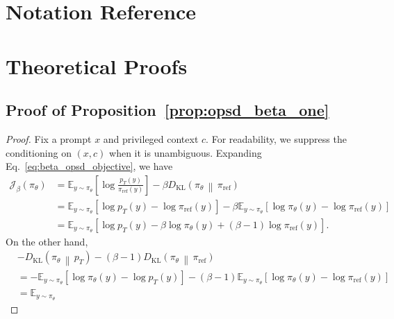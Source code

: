 \newpage

\section{Notation Reference}
\label{app:notation}

\clearpage

\section{Theoretical Proofs}
\label{app:rtg-proofs}
\subsection{Proof of Proposition~\ref{prop:opsd_beta_one}}
\label{app:regularized_rl}
\begin{proof}
Fix a prompt $x$ and privileged context $c$. For readability, we suppress the conditioning
on $(x,c)$ when it is unambiguous. Expanding Eq.~\ref{eq:beta_opsd_objective}, we have
\begin{align}
    \mathcal{J}_{\beta}(\pi_\theta)
    &=
    \mathbb{E}_{y\sim\pi_\theta}
    \left[
    \log
    \frac{
    p_T(y)
    }{
    \pi_{\mathrm{ref}}(y)
    }
    \right]
    -
    \beta
    D_{\mathrm{KL}}
    \left(
    \pi_\theta
    \,\middle\|\,
    \pi_{\mathrm{ref}}
    \right) \\
    &=
    \mathbb{E}_{y\sim\pi_\theta}
    \left[
    \log p_T(y)
    -
    \log \pi_{\mathrm{ref}}(y)
    \right]
    -
    \beta
    \mathbb{E}_{y\sim\pi_\theta}
    \left[
    \log \pi_\theta(y)
    -
    \log \pi_{\mathrm{ref}}(y)
    \right] \\
    &=
    \mathbb{E}_{y\sim\pi_\theta}
    \left[
    \log p_T(y)
    -
    \beta \log \pi_\theta(y)
    +
    (\beta-1)\log \pi_{\mathrm{ref}}(y)
    \right].
    \label{eq:beta_opsd_expanded}
\end{align}
On the other hand,
\begin{align}
    &-
    D_{\mathrm{KL}}
    \left(
    \pi_\theta
    \,\middle\|\,
    p_T
    \right)
    -
    (\beta-1)
    D_{\mathrm{KL}}
    \left(
    \pi_\theta
    \,\middle\|\,
    \pi_{\mathrm{ref}}
    \right) \\
    &=
    -
    \mathbb{E}_{y\sim\pi_\theta}
    \left[
    \log \pi_\theta(y)
    -
    \log p_T(y)
    \right]
    -
    (\beta-1)
    \mathbb{E}_{y\sim\pi_\theta}
    \left[
    \log \pi_\theta(y)
    -
    \log \pi_{\mathrm{ref}}(y)
    \right] \\
    &=
    \mathbb{E}_{y\sim\pi_\theta}

\end{align}
\end{proof}
